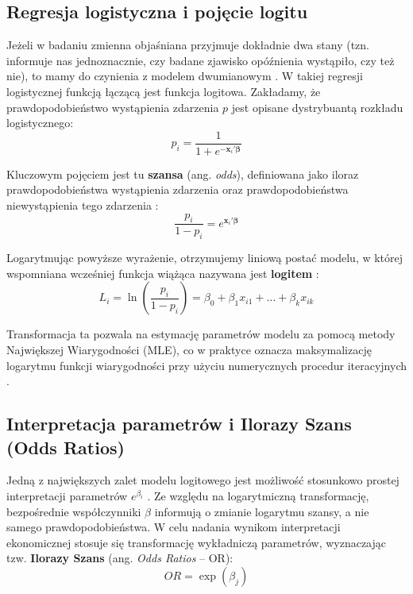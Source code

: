 \subsection{Regresja logistyczna i pojęcie logitu}

Jeżeli w badaniu zmienna objaśniana przyjmuje dokładnie dwa stany (tzn. informuje nas jednoznacznie, czy badane zjawisko opóźnienia wystąpiło, czy też nie), to mamy do czynienia z modelem dwumianowym \cite{jackowska2011}. W takiej regresji logistycznej funkcją łączącą jest funkcja logitowa. Zakładamy, że prawdopodobieństwo wystąpienia zdarzenia $p$ jest opisane dystrybuantą rozkładu logistycznego:
\begin{equation}
    p_i = \frac{1}{1 + e^{-\mathbf{x}_i' \boldsymbol{\beta}}}
\end{equation}

Kluczowym pojęciem jest tu \textbf{szansa} (ang. \textit{odds}), definiowana jako iloraz prawdopodobieństwa wystąpienia zdarzenia oraz prawdopodobieństwa niewystąpienia tego zdarzenia \cite{jackowska2011}:
\begin{equation}
    \frac{p_i}{1 - p_i} = e^{\mathbf{x}_i' \boldsymbol{\beta}}
\end{equation}

Logarytmując powyższe wyrażenie, otrzymujemy liniową postać modelu, w której wspomniana wcześniej funkcja wiążąca nazywana jest \textbf{logitem} \cite{jackowska2011}:
\begin{equation}
    L_i = \ln \left( \frac{p_i}{1 - p_i} \right) = \beta_0 + \beta_1 x_{i1} + \dots + \beta_k x_{ik}
\end{equation}

Transformacja ta pozwala na estymację parametrów modelu za pomocą metody Największej Wiarygodności (MLE), co w praktyce oznacza maksymalizację logarytmu funkcji wiarygodności przy użyciu numerycznych procedur iteracyjnych \cite{jackowska2011}.

\subsection{Interpretacja parametrów i Ilorazy Szans (Odds Ratios)}

Jedną z największych zalet modelu logitowego jest możliwość stosunkowo prostej interpretacji parametrów $e^{\beta_i}$ \cite{jackowska2011}. Ze względu na logarytmiczną transformację, bezpośrednie współczynniki $\beta$ informują o zmianie logarytmu szansy, a nie samego prawdopodobieństwa. W celu nadania wynikom interpretacji ekonomicznej stosuje się transformację wykładniczą parametrów, wyznaczając tzw. \textbf{Ilorazy Szans} (ang. \textit{Odds Ratios} -- OR):
\begin{equation}
    OR = \exp(\beta_j)
\end{equation}

